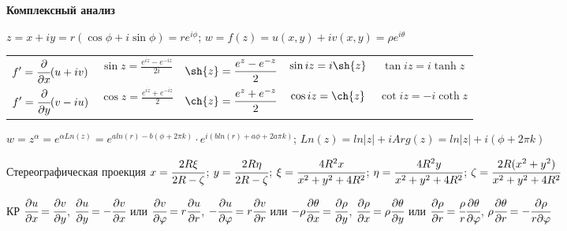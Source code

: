 \begin{center}
	\textbf{Комплексный анализ}
\end{center}
\vspace{1ex}

$\displaystyle z = x + iy = r(\cos{\phi} + i\sin{\phi}) = re^{i\phi}$;
$\displaystyle w = f(z) = u(x, y) + iv(x, y) = \rho e^{i\theta}$

\begin{tabular}{|c|c|c|c|c|}
	\hline
	$\displaystyle f'=\cfrac{\partial}{\partial x}(u + iv)$ &
	$\displaystyle \sin{z} = \frac{e^{iz} - e^{-iz}}{2i}$ &
	$\displaystyle \sh{z} = \frac{e^{z} - e^{-z}}{2}$ &
	$\displaystyle \sin{iz} = i\sh{z}$ &
	$\displaystyle \tan{iz} = i\tanh{z}$
	\\

	$\displaystyle f' = \cfrac{\partial}{\partial y}(v -iu)$ &
	$\displaystyle \cos{z} = \frac{e^{iz} + e^{-iz}}{2}$ &
	$\displaystyle \ch{z} = \frac{e^{z} + e^{-z}}{2}$ &
	$\displaystyle \cos{iz} = \ch{z}$ &
	$\cot{iz} = -i\coth{z}$
	\\
	\hline
\end{tabular}
\vspace{1ex}

\noindent
$\displaystyle w = z^\alpha = e^{\alpha Ln(z)} = e^{aln(r) - b(\phi + 2\pi k)}\cdot{e^{i(bln(r)+a\phi+2a\pi k)}}$; \hspace{1em}
$\displaystyle Ln(z) = ln|z| + iArg(z) = ln|z| + i(\phi + 2\pi k)$


\noindent
Стереографическая проекция
$\displaystyle x = \cfrac{2R\xi}{2R-\zeta}$;
$\displaystyle y = \cfrac{2R\eta}{2R-\zeta}$;
$\displaystyle \xi = \cfrac{4R^2x}{x^2+y^2+4R^2}$;
$\displaystyle \eta = \cfrac{4R^2y}{x^2+y^2+4R^2}$;
$\displaystyle \zeta = \cfrac{2R(x^2+y^2)}{x^2+y^2+4R^2}$

\noindent
КР
$\displaystyle \cfrac{\partial u}{\partial x} = \cfrac{\partial v}{\partial y}$,
$\displaystyle \cfrac{\partial u}{\partial y} = -\cfrac{\partial v}{\partial x}$
или
$\displaystyle \cfrac{\partial v}{\partial \phi} = r\cfrac{\partial u}{\partial r}$,
$-\displaystyle \cfrac{\partial u}{\partial \phi} = r\cfrac{\partial v}{\partial r}$ или
$\displaystyle -\rho\cfrac{\partial \theta}{\partial x} = \cfrac{\partial \rho}{\partial y}$,
$\displaystyle \cfrac{\partial \rho}{\partial x} = \rho \cfrac{\partial \theta}{\partial y}$
или
$\displaystyle \cfrac{\partial\rho}{\partial{r}}=\cfrac{\rho}{r}\cfrac{\partial\theta}{\partial\phi}$,
$\rho\cfrac{\partial\theta}{\partial{r}} = -\cfrac{\partial\rho}{r\partial\phi}$

